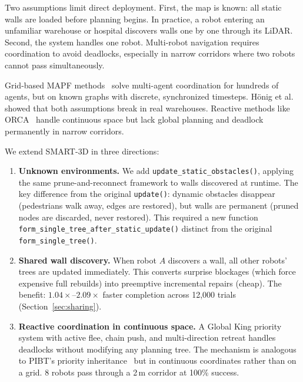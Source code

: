 \documentclass[letterpaper, 10pt, conference]{IEEEtran}
\newcommand{\smarttd}{SMART\nobreakdash-3D}
\begin{document}
Two assumptions limit direct deployment. First, the map is known: all static walls are loaded before planning begins. In practice, a robot entering an unfamiliar warehouse or hospital discovers walls one by one through its LiDAR. Second, the system handles one robot. Multi-robot navigation requires coordination to avoid deadlocks, especially in narrow corridors where two robots cannot pass simultaneously.

Grid-based MAPF methods~\cite{sharon2015cbs,okumura2022pibt,okumura2023lacam} solve multi-agent coordination for hundreds of agents, but on known graphs with discrete, synchronized timesteps. H\"onig et al.~\cite{honig2019persistent} showed that both assumptions break in real warehouses. Reactive methods like ORCA~\cite{berg2011reciprocal} handle continuous space but lack global planning and deadlock permanently in narrow corridors.

We extend \smarttd{} in three directions:

\begin{enumerate}
    \item \textbf{Unknown environments.} We add \texttt{update\_static\_obstacles()}, applying the same prune-and-reconnect framework to walls discovered at runtime. The key difference from the original \texttt{update()}: dynamic obstacles disappear (pedestrians walk away, edges are restored), but walls are permanent (pruned nodes are discarded, never restored). This required a new function \texttt{form\_single\_tree\_after\_static\_update()} distinct from the original \texttt{form\_single\_tree()}.

    \item \textbf{Shared wall discovery.} When robot $A$ discovers a wall, all other robots' trees are updated immediately. This converts surprise blockages (which force expensive full rebuilds) into preemptive incremental repairs (cheap). The benefit: $1.04\times$--$2.09\times$ faster completion across 12{,}000 trials (Section~\ref{sec:sharing}).

    \item \textbf{Reactive coordination in continuous space.} A Global King priority system with active flee, chain push, and multi-direction retreat handles deadlocks without modifying any planning tree. The mechanism is analogous to PIBT's priority inheritance~\cite{okumura2022pibt} but in continuous coordinates rather than on a grid. 8 robots pass through a 2\,m corridor at 100\% success.
\end{enumerate}
\end{document}
